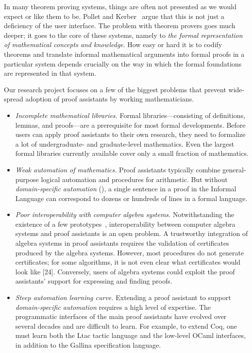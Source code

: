 \documentclass[12pt]{amsart}  %
\begin{document}
In many theorem proving systems, things are often not presented as we would expect or like them to be. Pollet and Kerber~\cite{PolletKerber:2007} argue that this is not just a deficiency of the user interface. The problem with theorem provers goes much deeper; it goes to the core of these systems, namely to \emph{the formal representation of mathematical concepts and knowledge}. How easy or hard it is to codify theorems and translate informal mathematical arguments into formal proofs in a particular system depends crucially on the way in which the formal foundations are represented in that system.

Our research project focuses on a few of the biggest problems that prevent wide-spread adoption of proof assistants by working mathematicians.

\begin{itemize}
\item \emph{Incomplete mathematical libraries.} Formal libraries---consisting of  definitions, lemmas, and proofs---are a prerequisite for most formal developments. Before users can apply proof assistants to their own research, they need to formalize a lot of undergraduate- and graduate-level mathematics. Even the largest formal libraries currently available cover only a small fraction of mathematics.

\item \emph{Weak automation of mathematics.} Proof assistants typically combine general-purpose logical automation and procedures for arithmetic. But without \textsl{domain-specific automation} (\dsa), a single sentence in a proof in the Informal Language can correspond to dozens or hundreds of lines in a formal language.

\item \emph{Poor interoperability with computer algebra systems.} Notwithstanding the
  existence of a few prototypes~\cite{MR1730396,MR1656868}, interoperability between
  computer algebra systems and proof assistants is an open problem. A trustworthy
  integration of algebra systems in proof assistants requires the validation of
  certificates produced by the algebra systems. However, most procedures do not generate
  certificates; for some algorithms, it is not even clear what certificates would look
  like [24]. Conversely, users of algebra systems could exploit the proof assistants'
  support for expressing and finding proofs.

\item \emph{Steep automation learning curve.}  Extending a proof
  assistant to support \textsl{domain-specific automation} requires a high level
  of expertise. The programmatic interfaces of the main proof assistants have
  evolved over several decades and are difficult to learn. For example,
  to extend Coq, one must learn both the Ltac tactic language and the
  low-level OCaml interfaces, in addition to the Gallina specification language.
\end{itemize}
\end{document}
